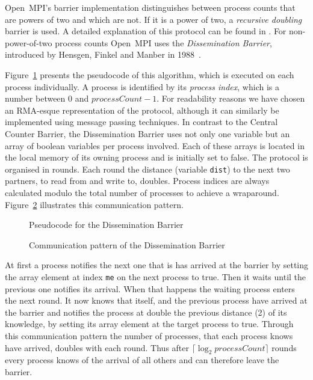 \documentclass[a4paper, 10pt]{article}
\begin{document}
Open~MPI's barrier implementation distinguishes between process counts that are powers of two and which are not. If it is a power of two, a \emph{recursive doubling} barrier is used. A detailed explanation of this protocol can be found in \cite{hoefler2005}. For non-power-of-two process counts Open~MPI uses the \emph{Dissemination Barrier}, introduced by Hensgen, Finkel and Manber in 1988~\cite{hensgen1988}.

Figure~\ref{fig:pseudocode-dissemination} presents the pseudocode of this algorithm, which is executed on each process individually. A process is identified by its \emph{process index}, which is a number between 0 and $\mathit{processCount} - 1$. For readability reasons we have chosen an RMA-esque representation of the protocol, although it can similarly be implemented using message passing techniques.
In contrast to the Central Counter Barrier, the Dissemination Barrier uses not only one variable but an array of boolean variables per process involved. Each of these arrays is located in the local memory of its owning process and is initially set to false.
The protocol is organised in rounds. Each round the distance (variable \texttt{dist}) to the next two partners, to read from and write to, doubles. Process indices  are always calculated modulo the total number of processes to achieve a wraparound. Figure~\ref{fig:diagram-dissemination} illustrates this communication pattern.

\begin{figure}[htbp]
	\centering
	
	\caption{Pseudocode for the Dissemination Barrier}
	\label{fig:pseudocode-dissemination}
\end{figure}

\begin{figure}[htbp]
	\centering
	
	\caption{Communication pattern of the Dissemination Barrier}
	\label{fig:diagram-dissemination}
\end{figure}

At first a process notifies the next one that is has arrived at the barrier by setting the array element at index \texttt{me} on the next process to true. Then it waits until the previous one notifies its arrival. When that happens the waiting process enters the next round. It now knows that itself, and the previous process have arrived at the barrier and notifies the process at double the previous distance (2) of its knowledge, by setting its array element at the target process to true. Through this communication pattern the number of processes, that each process knows have arrived, doubles with each round. Thus after $\lceil \log_2 \mathit{processCount} \rceil$ rounds every process knows of the arrival of all others and can therefore leave the barrier.
\end{document}
